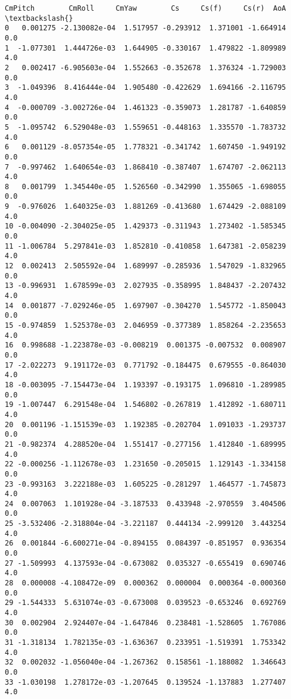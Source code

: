\documentclass[11pt]{article}
\begin{document}
\begin{tcolorbox}[breakable, size=fbox, boxrule=.5pt, pad at break*=1mm, opacityfill=0]
\begin{Verbatim}[commandchars=\\\{\}]
     CmPitch        CmRoll     CmYaw        Cs     Cs(f)     Cs(r)  AoA  \textbackslash{}
0   0.001275 -2.130082e-04  1.517957 -0.293912  1.371001 -1.664914  0.0
1  -1.077301  1.444726e-03  1.644905 -0.330167  1.479822 -1.809989  4.0
2   0.002417 -6.905603e-04  1.552663 -0.352678  1.376324 -1.729003  0.0
3  -1.049396  8.416444e-04  1.905480 -0.422629  1.694166 -2.116795  4.0
4  -0.000709 -3.002726e-04  1.461323 -0.359073  1.281787 -1.640859  0.0
5  -1.095742  6.529048e-03  1.559651 -0.448163  1.335570 -1.783732  4.0
6   0.001129 -8.057354e-05  1.778321 -0.341742  1.607450 -1.949192  0.0
7  -0.997462  1.640654e-03  1.868410 -0.387407  1.674707 -2.062113  4.0
8   0.001799  1.345440e-05  1.526560 -0.342990  1.355065 -1.698055  0.0
9  -0.976026  1.640325e-03  1.881269 -0.413680  1.674429 -2.088109  4.0
10 -0.004090 -2.304025e-05  1.429373 -0.311943  1.273402 -1.585345  0.0
11 -1.006784  5.297841e-03  1.852810 -0.410858  1.647381 -2.058239  4.0
12  0.002413  2.505592e-04  1.689997 -0.285936  1.547029 -1.832965  0.0
13 -0.996931  1.678599e-03  2.027935 -0.358995  1.848437 -2.207432  4.0
14  0.001877 -7.029246e-05  1.697907 -0.304270  1.545772 -1.850043  0.0
15 -0.974859  1.525378e-03  2.046959 -0.377389  1.858264 -2.235653  4.0
16  0.998688 -1.223878e-03 -0.008219  0.001375 -0.007532  0.008907  0.0
17 -2.022273  9.191172e-03  0.771792 -0.184475  0.679555 -0.864030  4.0
18 -0.003095 -7.154473e-04  1.193397 -0.193175  1.096810 -1.289985  0.0
19 -1.007447  6.291548e-04  1.546802 -0.267819  1.412892 -1.680711  4.0
20  0.001196 -1.151539e-03  1.192385 -0.202704  1.091033 -1.293737  0.0
21 -0.982374  4.288520e-04  1.551417 -0.277156  1.412840 -1.689995  4.0
22 -0.000256 -1.112678e-03  1.231650 -0.205015  1.129143 -1.334158  0.0
23 -0.993163  3.222188e-03  1.605225 -0.281297  1.464577 -1.745873  4.0
24  0.007063  1.101928e-04 -3.187533  0.433948 -2.970559  3.404506  0.0
25 -3.532406 -2.318804e-04 -3.221187  0.444134 -2.999120  3.443254  4.0
26  0.001844 -6.600271e-04 -0.894155  0.084397 -0.851957  0.936354  0.0
27 -1.509993  4.137593e-04 -0.673082  0.035327 -0.655419  0.690746  4.0
28  0.000008 -4.108472e-09  0.000362  0.000004  0.000364 -0.000360  0.0
29 -1.544333  5.631074e-03 -0.673008  0.039523 -0.653246  0.692769  4.0
30  0.002904  2.924407e-04 -1.647846  0.238481 -1.528605  1.767086  0.0
31 -1.318134  1.782135e-03 -1.636367  0.233951 -1.519391  1.753342  4.0
32  0.002032 -1.056040e-04 -1.267362  0.158561 -1.188082  1.346643  0.0
33 -1.030198  1.278172e-03 -1.207645  0.139524 -1.137883  1.277407  4.0


\end{Verbatim}
\end{tcolorbox}
\end{document}
